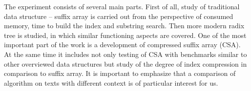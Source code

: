 
The experiment consists of several main parts.
First of all, study of traditional data structure -- suffix array is carried out
from the perspective of consumed memory, time to build the index and substring search.
Then more modern radix tree is studied, in which similar functioning aspects are covered.
One of the most important part of the work is a development of compressed suffix array (CSA).
At the same time it includes not only testing of CSA with benchmarks similar to other overviewed
data structures but study of the degree of index compression in comparison to suffix array.
It is important to emphasize that a comparison of algorithm on texts with different context
is of particular interest for us.

